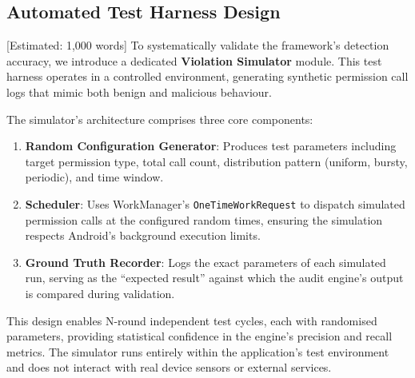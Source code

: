 \subsection{Automated Test Harness Design} [Estimated: 1,000 words]
To systematically validate the framework's detection accuracy, we introduce a dedicated \textbf{Violation Simulator} module. This test harness operates in a controlled environment, generating synthetic permission call logs that mimic both benign and malicious behaviour.

The simulator's architecture comprises three core components:
\begin{enumerate}
\item \textbf{Random Configuration Generator}: Produces test parameters including target permission type, total call count, distribution pattern (uniform, bursty, periodic), and time window.
\item \textbf{Scheduler}: Uses WorkManager's \texttt{OneTimeWorkRequest} to dispatch simulated permission calls at the configured random times, ensuring the simulation respects Android's background execution limits.
\item \textbf{Ground Truth Recorder}: Logs the exact parameters of each simulated run, serving as the ``expected result'' against which the audit engine's output is compared during validation.
\end{enumerate}

This design enables N-round independent test cycles, each with randomised parameters, providing statistical confidence in the engine's precision and recall metrics. The simulator runs entirely within the application's test environment and does not interact with real device sensors or external services.

